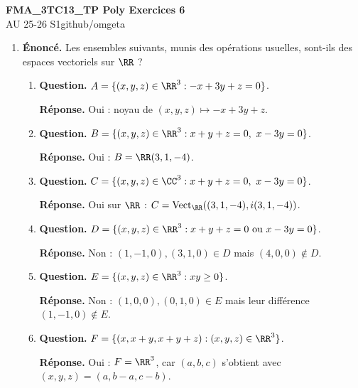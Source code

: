 \documentclass[12pt, a4paper]{article}
\newcommand{\mytitle}{FMA\_3TC13\_TP Poly Exercices 6}
\newcommand{\myauthor}{github/omgeta}
\newcommand{\mydate}{AU 25-26 S1}
\begin{document}
\raggedright
\footnotesize
\begin{center}
{\normalsize{\textbf{\mytitle}}} \\
{\footnotesize{\mydate\hspace{2pt}\textemdash\hspace{2pt}\myauthor}}
\end{center}
\begin{enumerate}[label=6.\arabic*., start=105]

  \item \begin{minipage}[t]{\linewidth}\raggedright
\textbf{Énoncé.} Les ensembles suivants, munis des opérations usuelles, sont-ils des espaces vectoriels sur $\RR$ ?

\begin{enumerate}[\arabic*.]
        \item \textbf{Question.} $A=\{(x,y,z)\in\RR^3:-x+3y+z=0\}$.
\par\smallskip
\textbf{Réponse.} Oui : noyau de $(x,y,z)\mapsto-x+3y+z$.

  \item \textbf{Question.} $B=\{(x,y,z)\in\RR^3:x+y+z=0,\ x-3y=0\}$.
\par\smallskip
\textbf{Réponse.} Oui : $B=\RR(3,1,-4)$.

  \item \textbf{Question.} $C=\{(x,y,z)\in\CC^3:x+y+z=0,\ x-3y=0\}$.
\par\smallskip
\textbf{Réponse.} Oui sur $\RR$ : $C=\operatorname{Vect}_{\RR}((3,1,-4),i(3,1,-4))$.

  \item \textbf{Question.} $D=\{(x,y,z)\in\RR^3:x+y+z=0\text{ ou }x-3y=0\}$.
\par\smallskip
\textbf{Réponse.} Non : $(1,-1,0),(3,1,0)\in D$ mais $(4,0,0)\notin D$.

  \item \textbf{Question.} $E=\{(x,y,z)\in\RR^3:xy\geq0\}$.
\par\smallskip
\textbf{Réponse.} Non : $(1,0,0),(0,1,0)\in E$ mais leur différence $(1,-1,0)\notin E$.

  \item \textbf{Question.} $F=\{(x,x+y,x+y+z):(x,y,z)\in\RR^3\}$.
\par\smallskip
\textbf{Réponse.} Oui : $F=\RR^3$, car $(a,b,c)$ s'obtient avec $(x,y,z)=(a,b-a,c-b)$.


\end{enumerate}
\end{minipage}
\end{enumerate}
\end{document}
